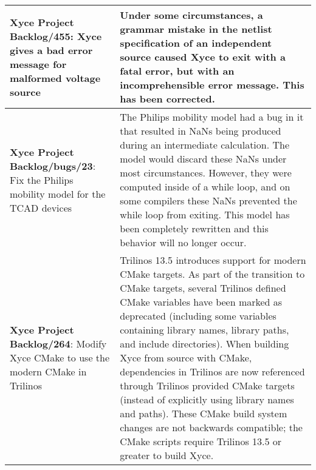 {\begin{longtable}[h] {>{\raggedright\small}m{2in}|>{\raggedright\let\\\tabularnewline\small}m{3.5in}}
\textbf{Xyce Project Backlog/455}:  Xyce gives a bad error message for
malformed voltage source & Under some circumstances, a grammar mistake
in the netlist specification of an independent source caused Xyce to
exit with a fatal error, but with an incomprehensible error message.
This has been corrected.
\\ \hline

\textbf{Xyce Project Backlog/bugs/23}:
Fix the Philips mobility model for the TCAD devices & The Philips
mobility model had a bug in it that resulted in NaNs being produced
during an intermediate calculation.  The model would discard these
NaNs under most circumstances.  However, they were computed inside of
a while loop, and on some compilers these NaNs prevented the while
loop from exiting.  This model has been completely rewritten and this
behavior will no longer occur.
\\ \hline

\textbf{Xyce Project Backlog/264}:  Modify Xyce CMake to use the modern CMake in Trilinos &
Trilinos 13.5 introduces support for modern CMake targets. As part of
the transition to CMake targets, several Trilinos defined CMake
variables have been marked as deprecated (including some variables
containing library names, library paths, and include
directories). When building Xyce from source with CMake, dependencies
in Trilinos are now referenced through Trilinos provided CMake targets
(instead of explicitly using library names and paths). These CMake
build system changes are not backwards compatible; the CMake scripts
require Trilinos 13.5 or greater to build Xyce.
\\ \hline

\end{longtable}
}
